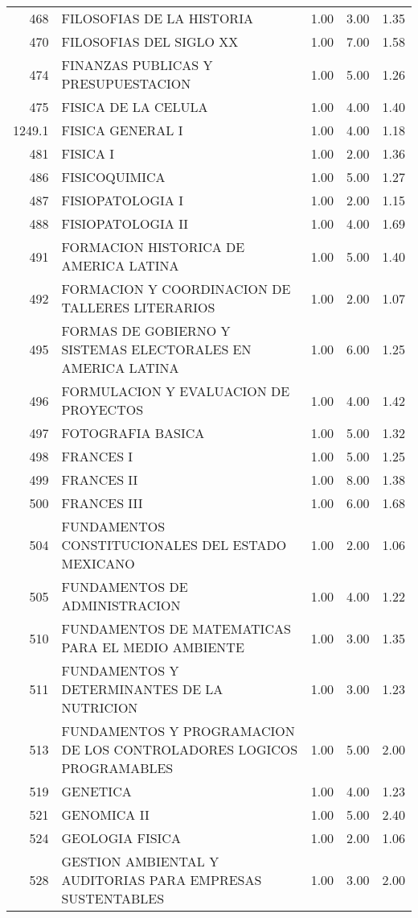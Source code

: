 \begin{table}[ht]
\begin{tabular}{rlrrr}
  468 & FILOSOFIAS DE LA HISTORIA & 1.00 & 3.00 & 1.35 \\ 
  470 & FILOSOFIAS DEL SIGLO XX & 1.00 & 7.00 & 1.58 \\ 
  474 & FINANZAS PUBLICAS Y PRESUPUESTACION & 1.00 & 5.00 & 1.26 \\ 
  475 & FISICA DE LA CELULA & 1.00 & 4.00 & 1.40 \\ 
  1249.1 & FISICA GENERAL I & 1.00 & 4.00 & 1.18 \\ 
  481 & FISICA I & 1.00 & 2.00 & 1.36 \\ 
  486 & FISICOQUIMICA & 1.00 & 5.00 & 1.27 \\ 
  487 & FISIOPATOLOGIA I & 1.00 & 2.00 & 1.15 \\ 
  488 & FISIOPATOLOGIA II & 1.00 & 4.00 & 1.69 \\ 
  491 & FORMACION HISTORICA DE AMERICA LATINA & 1.00 & 5.00 & 1.40 \\ 
  492 & FORMACION Y COORDINACION DE TALLERES LITERARIOS & 1.00 & 2.00 & 1.07 \\ 
  495 & FORMAS DE GOBIERNO Y SISTEMAS ELECTORALES EN AMERICA LATINA & 1.00 & 6.00 & 1.25 \\ 
  496 & FORMULACION Y EVALUACION DE PROYECTOS & 1.00 & 4.00 & 1.42 \\ 
  497 & FOTOGRAFIA BASICA & 1.00 & 5.00 & 1.32 \\ 
  498 & FRANCES I & 1.00 & 5.00 & 1.25 \\ 
  499 & FRANCES II & 1.00 & 8.00 & 1.38 \\ 
  500 & FRANCES III & 1.00 & 6.00 & 1.68 \\ 
  504 & FUNDAMENTOS CONSTITUCIONALES DEL ESTADO MEXICANO & 1.00 & 2.00 & 1.06 \\ 
  505 & FUNDAMENTOS DE ADMINISTRACION & 1.00 & 4.00 & 1.22 \\ 
  510 & FUNDAMENTOS DE MATEMATICAS PARA EL MEDIO AMBIENTE & 1.00 & 3.00 & 1.35 \\ 
  511 & FUNDAMENTOS Y DETERMINANTES DE LA NUTRICION & 1.00 & 3.00 & 1.23 \\ 
  513 & FUNDAMENTOS Y PROGRAMACION DE LOS CONTROLADORES LOGICOS PROGRAMABLES & 1.00 & 5.00 & 2.00 \\ 
  519 & GENETICA & 1.00 & 4.00 & 1.23 \\ 
  521 & GENOMICA II & 1.00 & 5.00 & 2.40 \\ 
  524 & GEOLOGIA FISICA & 1.00 & 2.00 & 1.06 \\ 
  528 & GESTION AMBIENTAL Y AUDITORIAS PARA EMPRESAS SUSTENTABLES & 1.00 & 3.00 & 2.00 \\ 

\end{tabular}
\end{table}
